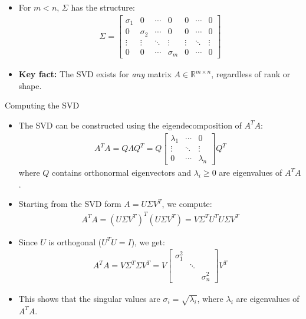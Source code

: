 \begin{frame}{}
\begin{itemize}
    \item For $m < n$, $\Sigma$ has the structure:
    \begin{align}
        \Sigma = \begin{bmatrix}
            \sigma_1 & 0 & \cdots & 0 & 0 & \cdots & 0 \\
            0 & \sigma_2 & \cdots & 0 & 0 & \cdots & 0\\
            \vdots & \vdots & \ddots & \vdots & \vdots & \ddots & \vdots \\
            0 & 0 & \cdots & \sigma_m & 0 & \cdots & 0
        \end{bmatrix}
    \end{align}
    \item \textbf{Key fact:} The SVD exists for \emph{any} matrix $A \in \mathbb{R}^{m \times n}$, regardless of rank or shape.
\end{itemize}
\end{frame}

\begin{frame}{Computing the SVD}
\begin{itemize}
    \item The SVD can be constructed using the eigendecomposition of $A^TA$:
    \begin{align}
        A^TA = Q\Lambda Q^T = Q \begin{bmatrix}
            \lambda_1 & \cdots & 0\\
            \vdots & \ddots & \vdots\\
            0 & \cdots & \lambda_n
        \end{bmatrix} Q^T
    \end{align}
    where $Q$ contains orthonormal eigenvectors and $\lambda_i \geq 0$ are eigenvalues of $A^TA$.
    \item Starting from the SVD form $A = U\Sigma V^T$, we compute:
    \begin{align}
        A^TA = (U\Sigma V^T)^T (U\Sigma V^T) = V\Sigma^T U^T U \Sigma V^T
    \end{align}
\end{itemize}
\end{frame}

\begin{frame}{}
\begin{itemize}
    \item Since $U$ is orthogonal ($U^TU = I$), we get:
    \begin{align}
        A^TA = V\Sigma^T \Sigma V^T = V \begin{bmatrix}
            \sigma_1^2 & & \\
            & \ddots & \\
            & & \sigma_n^2
        \end{bmatrix} V^T
    \end{align}
    \item This shows that the singular values are $\sigma_i = \sqrt{\lambda_i}$, where $\lambda_i$ are eigenvalues of $A^TA$.
\end{itemize}
\end{frame}
